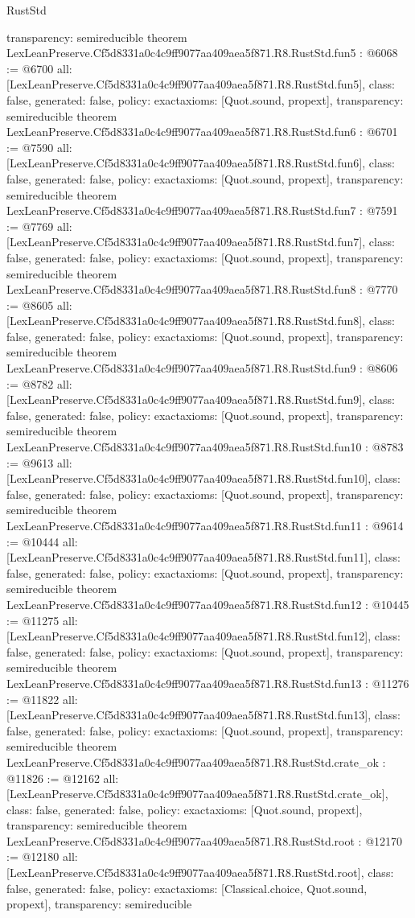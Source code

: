 \begin{lexlean}{RustStd}
\begin{coremodule}
{  transparency: semireducible
}
theorem LexLeanPreserve.Cf5d8331a0c4c9ff9077aa409aea5f871.R8.RustStd.fun5 : @6068 := @6700 {
  all: [LexLeanPreserve.Cf5d8331a0c4c9ff9077aa409aea5f871.R8.RustStd.fun5],
  class: false,
  generated: false,
  policy: exact{axioms: [Quot.sound, propext]},
  transparency: semireducible
}
theorem LexLeanPreserve.Cf5d8331a0c4c9ff9077aa409aea5f871.R8.RustStd.fun6 : @6701 := @7590 {
  all: [LexLeanPreserve.Cf5d8331a0c4c9ff9077aa409aea5f871.R8.RustStd.fun6],
  class: false,
  generated: false,
  policy: exact{axioms: [Quot.sound, propext]},
  transparency: semireducible
}
theorem LexLeanPreserve.Cf5d8331a0c4c9ff9077aa409aea5f871.R8.RustStd.fun7 : @7591 := @7769 {
  all: [LexLeanPreserve.Cf5d8331a0c4c9ff9077aa409aea5f871.R8.RustStd.fun7],
  class: false,
  generated: false,
  policy: exact{axioms: [Quot.sound, propext]},
  transparency: semireducible
}
theorem LexLeanPreserve.Cf5d8331a0c4c9ff9077aa409aea5f871.R8.RustStd.fun8 : @7770 := @8605 {
  all: [LexLeanPreserve.Cf5d8331a0c4c9ff9077aa409aea5f871.R8.RustStd.fun8],
  class: false,
  generated: false,
  policy: exact{axioms: [Quot.sound, propext]},
  transparency: semireducible
}
theorem LexLeanPreserve.Cf5d8331a0c4c9ff9077aa409aea5f871.R8.RustStd.fun9 : @8606 := @8782 {
  all: [LexLeanPreserve.Cf5d8331a0c4c9ff9077aa409aea5f871.R8.RustStd.fun9],
  class: false,
  generated: false,
  policy: exact{axioms: [Quot.sound, propext]},
  transparency: semireducible
}
theorem LexLeanPreserve.Cf5d8331a0c4c9ff9077aa409aea5f871.R8.RustStd.fun10 : @8783 := @9613 {
  all: [LexLeanPreserve.Cf5d8331a0c4c9ff9077aa409aea5f871.R8.RustStd.fun10],
  class: false,
  generated: false,
  policy: exact{axioms: [Quot.sound, propext]},
  transparency: semireducible
}
theorem LexLeanPreserve.Cf5d8331a0c4c9ff9077aa409aea5f871.R8.RustStd.fun11 : @9614 := @10444 {
  all: [LexLeanPreserve.Cf5d8331a0c4c9ff9077aa409aea5f871.R8.RustStd.fun11],
  class: false,
  generated: false,
  policy: exact{axioms: [Quot.sound, propext]},
  transparency: semireducible
}
theorem LexLeanPreserve.Cf5d8331a0c4c9ff9077aa409aea5f871.R8.RustStd.fun12 : @10445 := @11275 {
  all: [LexLeanPreserve.Cf5d8331a0c4c9ff9077aa409aea5f871.R8.RustStd.fun12],
  class: false,
  generated: false,
  policy: exact{axioms: [Quot.sound, propext]},
  transparency: semireducible
}
theorem LexLeanPreserve.Cf5d8331a0c4c9ff9077aa409aea5f871.R8.RustStd.fun13 : @11276 := @11822 {
  all: [LexLeanPreserve.Cf5d8331a0c4c9ff9077aa409aea5f871.R8.RustStd.fun13],
  class: false,
  generated: false,
  policy: exact{axioms: [Quot.sound, propext]},
  transparency: semireducible
}
theorem LexLeanPreserve.Cf5d8331a0c4c9ff9077aa409aea5f871.R8.RustStd.crate_ok : @11826 := @12162 {
  all: [LexLeanPreserve.Cf5d8331a0c4c9ff9077aa409aea5f871.R8.RustStd.crate_ok],
  class: false,
  generated: false,
  policy: exact{axioms: [Quot.sound, propext]},
  transparency: semireducible
}
theorem LexLeanPreserve.Cf5d8331a0c4c9ff9077aa409aea5f871.R8.RustStd.root : @12170 := @12180 {
  all: [LexLeanPreserve.Cf5d8331a0c4c9ff9077aa409aea5f871.R8.RustStd.root],
  class: false,
  generated: false,
  policy: exact{axioms: [Classical.choice, Quot.sound, propext]},
  transparency: semireducible
}


\end{coremodule}
\end{lexlean}
